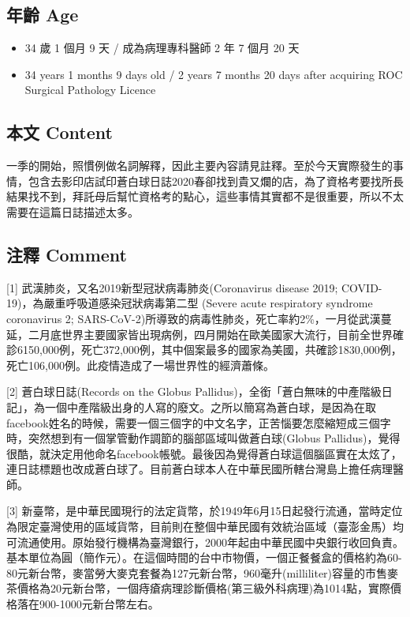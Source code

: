 \documentclass[a5paper, 11pt
]{book}
\providecommand{\tightlist}{%
  \setlength{\itemsep}{0pt}\setlength{\parskip}{0pt}}
\begin{document}
\hypertarget{ux5e74ux9f61-age}{%
\subsection{年齡 Age}\label{ux5e74ux9f61-age}}

\begin{itemize}
\tightlist
\item
  34 歲 1 個月 9 天 / 成為病理專科醫師 2 年 7 個月 20 天
\item
  34 years 1 months 9 days old / 2 years 7 months 20 days after
  acquiring ROC Surgical Pathology Licence
\end{itemize}

\hypertarget{ux672cux6587-content}{%
\subsection{本文 Content}\label{ux672cux6587-content}}

一季的開始，照慣例做名詞解釋，因此主要內容請見註釋。至於今天實際發生的事情，包含去影印店試印蒼白球日誌2020春卻找到貴又爛的店，為了資格考要找所長結果找不到，拜託母后幫忙資格考的點心，這些事情其實都不是很重要，所以不太需要在這篇日誌描述太多。

\hypertarget{ux6ce8ux91cb-comment}{%
\subsection{注釋 Comment}\label{ux6ce8ux91cb-comment}}

{[}1{]} 武漢肺炎，又名2019新型冠狀病毒肺炎(Coronavirus disease 2019;
COVID-19)，為嚴重呼吸道感染冠狀病毒第二型 (Severe acute respiratory
syndrome coronavirus 2;
SARS-CoV-2)所導致的病毒性肺炎，死亡率約2\%，一月從武漢蔓延，二月底世界主要國家皆出現病例，四月開始在歐美國家大流行，目前全世界確診6150,000例，死亡372,000例，其中個案最多的國家為美國，共確診1830,000例，死亡106,000例。此疫情造成了一場世界性的經濟蕭條。

{[}2{]} 蒼白球日誌(Records on the Globus
Pallidus)，全銜「蒼白無味的中產階級日記」，為一個中產階級出身的人寫的廢文。之所以簡寫為蒼白球，是因為在取facebook姓名的時候，需要一個三個字的中文名字，正苦惱要怎麼縮短成三個字時，突然想到有一個掌管動作調節的腦部區域叫做蒼白球(Globus
Pallidus)，覺得很酷，就決定用他命名facebook帳號。最後因為覺得蒼白球這個腦區實在太炫了，連日誌標題也改成蒼白球了。目前蒼白球本人在中華民國所轄台灣島上擔任病理醫師。

{[}3{]}
新臺幣，是中華民國現行的法定貨幣，於1949年6月15日起發行流通，當時定位為限定臺灣使用的區域貨幣，目前則在整個中華民國有效統治區域（臺澎金馬）均可流通使用。原始發行機構為臺灣銀行，2000年起由中華民國中央銀行收回負責。基本單位為圓（簡作元）。在這個時間的台中市物價，一個正餐餐盒的價格約為60-80元新台幣，麥當勞大麥克套餐為127元新台幣，960毫升(milliliter)容量的市售麥茶價格為20元新台幣，一個痔瘡病理診斷價格(第三級外科病理)為1014點，實際價格落在900-1000元新台幣左右。
\end{document}
